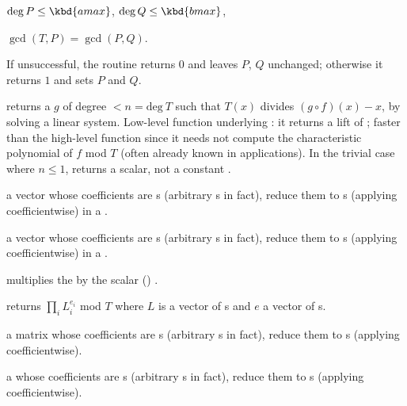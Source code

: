 \item $\deg P \leq \kbd{amax}$, $\deg Q \leq \kbd{bmax}$,

\item $\gcd(T,P) = \gcd(P,Q)$.

\noindent If unsuccessful, the routine returns $0$ and leaves $P$, $Q$
unchanged; otherwise it returns $1$ and sets $P$ and $Q$.

 returns a  $g$ of degree $< n
= \text{deg}~T$ such that $T(x)$ divides $(g \circ f)(x) - x$, by solving a
linear system. Low-level function underlying : it returns a
lift of \kbd[modreverse(f,T)]; faster than the high-level function since it
needs not compute the characteristic polynomial of $f$ mod $T$ (often already
known in applications). In the trivial case where $n \leq 1$, returns a
scalar, not a constant .


  a vector whose
coefficients are s (arbitrary s in fact), reduce them to
s (applying  coefficientwise) in a .

  a vector whose
coefficients are s (arbitrary s in fact), reduce them to
s (applying  coefficientwise) in a .

  multiplies the
   by the scalar () .

 returns
$\prod_i L_i^{e_i}$ mod $T$ where $L$ is a vector of s and
$e$ a vector of s.


  a matrix whose
coefficients are s (arbitrary s in fact), reduce them to
s (applying  coefficientwise).



  a  whose
coefficients are s (arbitrary s in fact), reduce them to
s (applying  coefficientwise).



